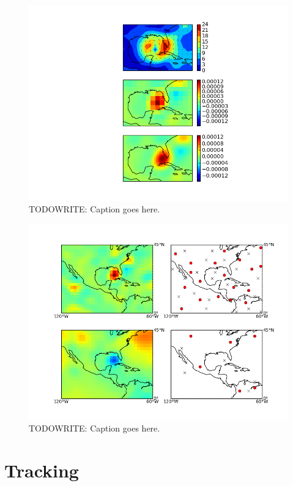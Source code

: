 \documentclass[pdftex,12pt,a4paper]{report}
\begin{document}
\begin{figure}[hbp]
    \centering
    \includegraphics[width=\textwidth]{figures/katrina_data_proc}
    \caption{TODOWRITE: Caption goes here.}
    \label{fig:katrina_data_proc}
\end{figure}

\begin{figure}[hbp]
    \centering
    \includegraphics[width=\textwidth]{figures/katrina_max_mins}
    \caption{TODOWRITE: Caption goes here.}
    \label{fig:katrina_max_mins}
\end{figure}

\section{Tracking}
\end{document}
